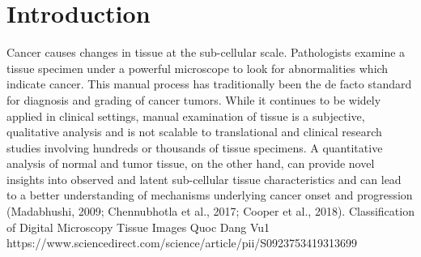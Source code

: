 
\chapter{Introduction}\label{chapter:introduction}
Cancer causes changes in tissue at the sub-cellular scale. Pathologists examine a tissue specimen
under a powerful microscope to look for abnormalities which indicate cancer. This manual
process has traditionally been the de facto standard for diagnosis and grading of cancer tumors.
While it continues to be widely applied in clinical settings, manual examination of tissue is a
subjective, qualitative analysis and is not scalable to translational and clinical research studies
involving hundreds or thousands of tissue specimens. A quantitative analysis of normal and tumor
tissue, on the other hand, can provide novel insights into observed and latent sub-cellular tissue characteristics and can lead to a better understanding of
mechanisms underlying cancer onset and progression
(Madabhushi, 2009; Chennubhotla et al., 2017;
Cooper et al., 2018). 
Classification of Digital Microscopy
Tissue Images
Quoc Dang Vu1
https://www.sciencedirect.com/science/article/pii/S0923753419313699